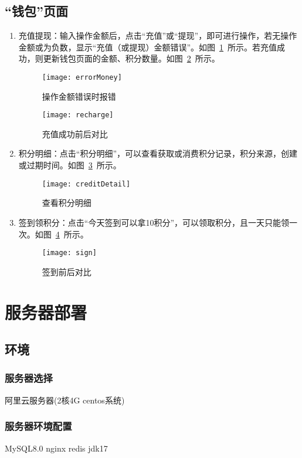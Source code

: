 \subsection{“钱包”页面}
\begin{enumerate}
\item {充值提现}：输入操作金额后，点击“充值”或“提现”，即可进行操作，若无操作金额或为负数，显示“充值（或提现）金额错误”。如图~\ref{fig:errorMoney}~所示。若充值成功，则更新钱包页面的金额、积分数量。如图~\ref{fig:recharge}~所示。
\begin{figure}[htbp]
    \centering
    \texttt{[image: errorMoney]}
    \caption{操作金额错误时报错}\label{fig:errorMoney}
\end{figure}
\begin{figure}[htbp]
    \centering
    \texttt{[image: recharge]}
    \caption{充值成功前后对比}\label{fig:recharge}
\end{figure} 
\item {积分明细}：点击“积分明细”，可以查看获取或消费积分记录，积分来源，创建或过期时间。如图~\ref{fig:creditDetail}~所示。
\begin{figure}[htbp]
    \centering
    \texttt{[image: creditDetail]}
    \caption{查看积分明细}\label{fig:creditDetail}
\end{figure} 
\item {签到领积分}：点击“今天签到可以拿10积分”，可以领取积分，且一天只能领一次。如图~\ref{fig:sign}~所示。
\begin{figure}[htbp]
    \centering
    \texttt{[image: sign]}
    \caption{签到前后对比}\label{fig:sign}
\end{figure} 
\end{enumerate}

\section{服务器部署}
\subsection{环境}
\subsubsection{服务器选择}
阿里云服务器(2核4G centos系统) 

\subsubsection{服务器环境配置}
MySQL8.0 nginx	redis jdk17

